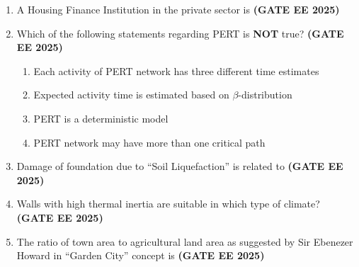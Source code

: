 \documentclass[journal,12pt,onecolumn]{IEEEtran}
\theoremstyle{remark}
\begin{document}
\begin{enumerate}
\item  A Housing Finance Institution in the private sector is \hfill \textbf{(GATE EE 2025)} 
\begin{enumerate}
\end{enumerate}
\item  Which of the following statements regarding PERT is \textbf{NOT} true?  \hfill \textbf{(GATE EE 2025)}
\begin{enumerate}
    \item Each activity of PERT network has three different time estimates
    \item Expected activity time is estimated based on $\beta$-distribution
    \item PERT is a deterministic model
    \item PERT network may have more than one critical path
\end{enumerate}
\item Damage of foundation due to ``Soil Liquefaction'' is related to  \hfill \textbf{(GATE EE 2025)}
\begin{enumerate}
\end{enumerate}
\item Walls with high thermal inertia are suitable in which type of climate?  \hfill \textbf{(GATE EE 2025)}
\begin{enumerate}
\end{enumerate}
\item The ratio of town area to agricultural land area as suggested by Sir Ebenezer Howard in ``Garden City'' concept is  \hfill \textbf{(GATE EE 2025)}

\end{enumerate}
\end{document}
